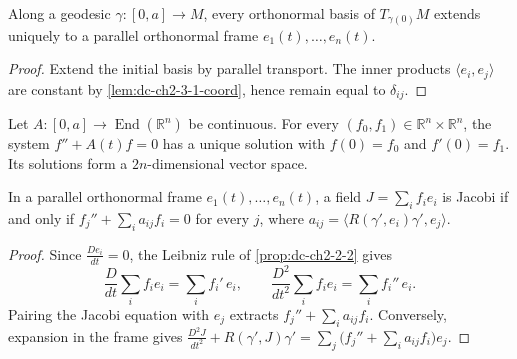 \begin{lemma}
  \label{lem:dc-ch5-2-1-parallel-frame}

  Along a geodesic $\gamma:[0,a]\to M$, every orthonormal basis of
  $T_{\gamma(0)}M$ extends uniquely to a parallel orthonormal frame
  $e_1(t),\dots,e_n(t)$.
\end{lemma}
\begin{proof}

  \sketch
  Extend the initial basis by parallel transport. The inner products
  $\langle e_i,e_j\rangle$ are constant by
  \cref{lem:dc-ch2-3-1-coord}, hence remain equal to $\delta_{ij}$.
\end{proof}

\begin{lemma}
  \label{lem:dc-ch5-2-1-ode}


  Let $A:[0,a]\to\operatorname{End}(\mathbb R^n)$ be continuous. For every
  $(f_0,f_1)\in\mathbb R^n\times\mathbb R^n$, the system
  $f''+A(t)f=0$ has a unique solution with $f(0)=f_0$ and $f'(0)=f_1$.
  Its solutions form a $2n$-dimensional vector space.
\end{lemma}

\begin{lemma}
  \label{lem:dc-ch5-2-1-frame-reduction}


  In a parallel orthonormal frame $e_1(t),\dots,e_n(t)$, a field
  $J=\sum_i f_i e_i$ is Jacobi if and only if
  $f_j''+\sum_i a_{ij}f_i=0$ for every $j$, where
  $a_{ij}=\langle R(\gamma',e_i)\gamma',e_j\rangle$.
\end{lemma}
\begin{proof}

  \sketch
  Since $\frac{De_i}{dt}=0$, the Leibniz rule of
  \cref{prop:dc-ch2-2-2} gives
  $$
  \frac{D}{dt}\sum_i f_i e_i=\sum_i f_i'\,e_i,\qquad
  \frac{D^2}{dt^2}\sum_i f_i e_i=\sum_i f_i''\,e_i.
  $$
  Pairing the Jacobi equation with $e_j$ extracts
  $f_j''+\sum_i a_{ij}f_i$. Conversely, expansion in the frame gives
  $\frac{D^2J}{dt^2}+R(\gamma',J)\gamma'=\sum_j\big(f_j''+\sum_i a_{ij}f_i\big)e_j$.
\end{proof}

